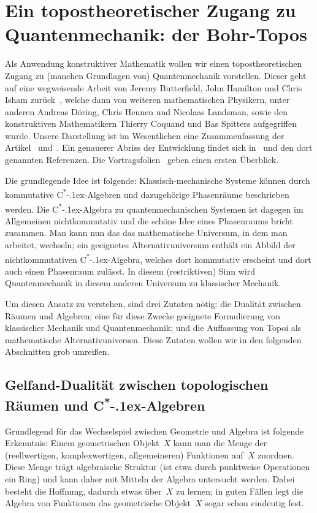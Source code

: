 \documentclass[a4paper,ngerman,12pt]{scrartcl}
\theoremstyle{definition}
\theoremstyle{plain}
\theoremstyle{remark}
\newcommand{\csalgebra}{C\textsuperscript{*}\kern-.1ex-Algebra}
\newcommand{\csalgebren}{C\textsuperscript{*}\kern-.1ex-Alge\-bren}
\renewcommand{\_}{\mathpunct{.}\,}
\newcommand{\?}{\,{:}\,}
\begin{document}
\section{Ein topostheoretischer Zugang zu Quantenmechanik: der Bohr-Topos}
\label{qm-topos}

Als Anwendung konstruktiver Mathematik wollen wir einen topostheoretischen
Zugang zu (manchen Grundlagen von) Quantenmechanik vorstellen. Dieser geht auf
eine wegweisende Arbeit von Jeremy Butterfield, John Hamilton und Chris Isham
zurück~\cite{butterfield:hamilton:isham:1}, welche dann von weiteren
mathematischen Physikern, unter anderen Andreas Döring, Chris Heunen und Nicolaas
Landsman, sowie den konstruktiven Mathematikern Thierry Coquand und Bas Spitters
aufgegriffen wurde. Unsere Darstellung ist im Wesentlichen eine Zusammenfassung
der Artikel~\cite{topos:aqt} und~\cite{nlab:bohrtopos}. Ein genauerer Abriss
der Entwicklung findet sich in~\cite{nlab:bohrtopos} und den dort genannten
Referenzen. Die Vortragsfolien~\cite{topos:aqt:slides} geben einen ersten
Überblick.

Die grundlegende Idee ist folgende:
Klassisch-mechanische Systeme können durch kommutative \csalgebren{} und
dazugehörige Phasenräume beschrieben werden. Die \csalgebra{} zu
quantenmechanischen Systemen ist dagegen im Allgemeinen nichtkommutativ und die
schöne Idee eines Phasenraums bricht zusammen. Man kann nun das das
mathematische Universum, in dem man arbeitet, wechseln; ein geeignetes
Alternativuniversum enthält ein Abbild der nichtkommutativen \csalgebra,
welches dort kommutativ erscheint und dort auch einen Phasenraum zulässt. In
diesem (restriktiven) Sinn wird Quantenmechanik in diesem anderen Universum zu
klassischer Mechanik.

Um diesen Ansatz zu verstehen, sind drei Zutaten nötig: die Dualität zwischen
Räumen und Algebren; eine für diese Zwecke geeignete Formulierung von
klassischer Mechanik und Quantenmechanik; und die Auffassung von Topoi als
mathematische Alternativuniversen. Diese Zutaten wollen wir in den folgenden
Abschnitten grob umreißen.


\subsection{\texorpdfstring{Gelfand-Dualität zwischen topologischen Räumen und
\csalgebren}{Gelfand-Dualität zwischen topologischen Räumen und C*-Algebren}}

Grundlegend für das Wechselspiel zwischen Geometrie und Algebra ist folgende
Erkenntnis: Einem geometrischen Objekt~$X$ kann man die Menge der
(reellwertigen, komplexwertigen, allgemeineren) Funktionen auf~$X$ zuordnen.
Diese Menge trägt algebraische Struktur (ist etwa durch punktweise Operationen ein Ring) und kann daher mit
Mitteln der Algebra untersucht werden. Dabei besteht die Hoffnung, dadurch
etwas über~$X$ zu lernen; in guten Fällen legt die Algebra von Funktionen
das geometrische Objekt~$X$ sogar schon eindeutig fest.
\end{document}
